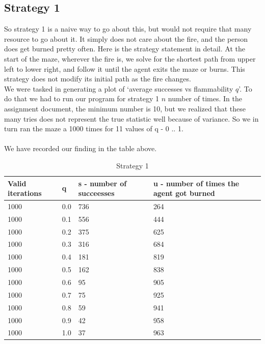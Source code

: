 \documentclass[11pt]{scrartcl} %
\begin{document}
\subsection{Strategy 1}
So strategy 1 is a naive way to go about this, but would not require that many resource to go about it. It simply does not care about the fire, and the person does get burned pretty often. Here is the strategy statement in detail. At the start of the maze, wherever the fire is, we solve for the shortest path from upper left to lower right, and follow  it  until the  agent  exits  the  maze  or  burns.   This  strategy  does  not  modify  its  initial  path  as  the  fire changes.
\vspace{2em}\\
We were tasked in generating a plot of ‘average successes vs flammability $q$’. To do that we had to run our program for strategy 1 $n$ number of times. In the assignment document, the minimum number is 10, but we realized that these many tries does not represent the true statistic well because of variance. So we in turn ran the maze a 1000 times for 11 values of q - 0 .. 1. \\
\pagebreak\\
We have recorded our finding in the table above.\\
\begin{table}[]
\caption{Strategy 1}
\begin{tabular}{|l|l|l|l|}
\hline
\textbf{Valid iterations} & \textbf{q} & \textbf{s - number of succeesses} & \textbf{u - number of times the agent got burned} \\ \hline
1000 & 0.0   & 736 & 264 \\ \hline
1000 & 0.1 & 556 & 444 \\ \hline
1000 & 0.2 & 375 & 625 \\ \hline
1000 & 0.3 & 316 & 684 \\ \hline
1000 & 0.4 & 181 & 819 \\ \hline
1000 & 0.5 & 162 & 838 \\ \hline
1000 & 0.6 & 95  & 905 \\ \hline
1000 & 0.7 & 75  & 925 \\ \hline
1000 & 0.8 & 59  & 941 \\ \hline
1000 & 0.9 & 42  & 958 \\ \hline
1000 & 1.0   & 37  & 963 \\ \hline
\end{tabular}
\end{table}\\
\end{document}

